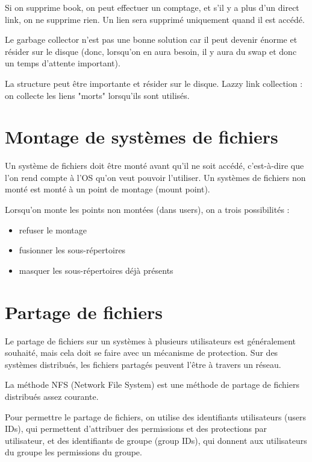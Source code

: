 		Si on supprime book, on peut effectuer un comptage, et s'il y a plus d'un direct link, on ne supprime rien. Un lien sera supprimé uniquement quand il est accédé.
		
		Le garbage collector n'est pas une bonne solution car il peut devenir énorme et résider sur le disque (donc, lorsqu'on en aura besoin, il y aura du swap et donc un temps d'attente important).
		
		La structure peut être importante et résider sur le disque. Lazzy link collection : on collecte les liens "morts" lorsqu'ils sont utilisés.
		
		
\section{Montage de systèmes de fichiers}

Un système de fichiers doit être monté avant qu'il ne soit accédé, c'est-à-dire que l'on rend compte à l'OS qu'on veut pouvoir l'utiliser. Un systèmes de fichiers non monté est monté à un point de montage (mount point).


Lorsqu'on monte les points non montées (dans users), on a trois possibilités :

\begin{itemize}
	\item refuser le montage
	\item fusionner les sous-répertoires
	\item masquer les sous-répertoires déjà présents
\end{itemize}

\section{Partage de fichiers}

Le partage de fichiers sur un systèmes à plusieurs utilisateurs est généralement souhaité, mais cela doit se faire avec un mécanisme de protection. Sur des systèmes distribués, les fichiers partagés peuvent l'être à travers un réseau. 

La méthode NFS (Network File System) est une méthode de partage de fichiers distribués assez courante.

Pour permettre le partage de fichiers, on utilise des identifiants utilisateurs (users IDs), qui permettent d'attribuer des permissions et des protections par utilisateur, et des identifiants de groupe (group IDs), qui donnent aux utilisateurs du groupe les permissions du groupe.

